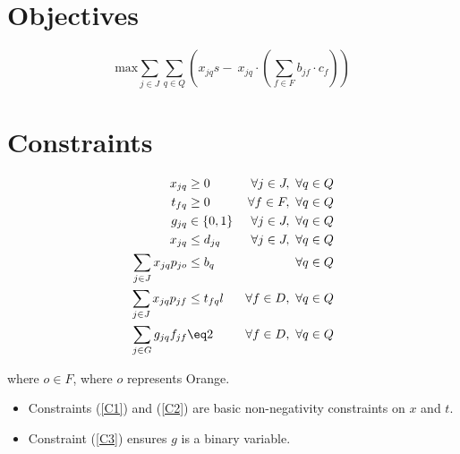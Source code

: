 \documentclass[a4paper]{article}
\newcommand{\SET}[1]{\{ {#1} \}}
\begin{document}
\section*{Objectives}

\[
\text{max} \sum_{j \in J}\sum_{q \in Q} (x_{jq} s -\: x_{jq} \cdot \left(\sum_{f \in F} b_{jf} \cdot c_f\right))
\]

\section*{Constraints}

\begin{align}
x_{jq} & \geq 0 & \forall j \in J,\  \forall q \in Q \label{C1}\\
t_{fq} & \geq 0 & \forall f \in F,\  \forall q \in Q \label{C2}\\
g_{jq} & \in \SET{0, 1} & \forall j \in J,\ \forall q \in Q \label{C3}\\
x_{jq} & \leq d_{jq} & \forall j \in J,\ \forall q \in Q \label{C4}\\
\sum_{j \in J} x_{jq} p_{jo} & \leq b_q & \forall q \in Q \label{C5}\\
\sum_{j \in J}  x_{jq} p_{jf} & \leq t_{fq} l & \forall f \in D,\ \forall q \in Q \label{C5}\\
\sum_{j \in G}  g_{jq} f_{jf} & \eq 2 & \forall f \in D,\ \forall q \in Q \label{C6}
\end{align}

where $o \in F$, where $o$ represents Orange.

\begin{itemize}
    \item Constraints (\ref{C1}) and (\ref{C2}) are basic non-negativity constraints on $x$ and $t$. 
    \item Constraint (\ref{C3}) ensures $g$ is a binary variable.
\end{itemize}
\end{document}
